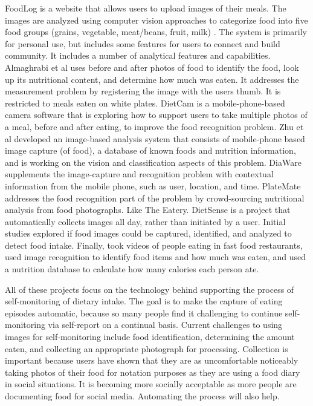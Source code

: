 FoodLog \citep{aizawa_food_2010, kitamura_foodlog:_2009, de_silva_clustering_2011} is a website that allows users to upload images of their meals. The images are analyzed using computer vision approaches to categorize food into five food groups (grains, vegetable, meat/beans, fruit, milk) \citep{kitamura_image_2010}. The system is primarily for personal use, but includes some features for users to connect and build community. It includes a number of analytical features and capabilities. Almaghrabi et al \citep{almaghrabi_novel_2012} uses before and after photos of food to identify the food, look up its nutritional content, and determine how much was eaten. It addresses the measurement problem by registering the image with the users thumb. It is restricted to meals eaten on white plates. DietCam \citep{fanyu_kong_dietcam:_2011, Kong2011} is a mobile-phone-based camera software that is exploring how to support users to take multiple photos of a meal, before and after eating, to improve the food recognition problem. Zhu et al \citep{zhu_use_2010, bosch_integrated_2011, zhu_image_2010, kim_development_2010} developed an image-based analysis system that consists of mobile-phone based image capture (of food), a database of known foods and nutrition information, and is working on the vision and classification aspects of this problem. DiaWare \citep{shroff_wearable_2008} supplements the image-capture and recognition problem with contextual information from the mobile phone, such as user, location, and time. 
PlateMate \citep{noronha_platemate:_2011} addresses the food recognition part of the problem by crowd-sourcing nutritional analysis from food photographs. Like The Eatery.  DietSense \citep{reddy_image_2007} is a project that automatically collects images all day, rather than initiated by a user. Initial studies explored if food images could be captured, identified, and analyzed to detect food intake. Finally, \citep{wen_wu_fast_2009} took videos of people eating in fast food restaurants, used image recognition to identify food items and how much was eaten, and used a nutrition database to calculate how many calories each person ate. 

All of these projects focus on the technology behind supporting the process of self-monitoring of dietary intake. The goal is to make the capture of eating episodes automatic, because so many people find it challenging to continue self-monitoring via self-report on a continual basis. Current challenges to using images for self-monitoring include food identification, determining the amount eaten, and collecting an appropriate photograph for processing. Collection is important because users have shown that they are as uncomfortable noticeably taking photos of their food for notation purposes as they are using a food diary in social situations. It is becoming more socially acceptable as more people are documenting food for social media. Automating the process will also help. 

